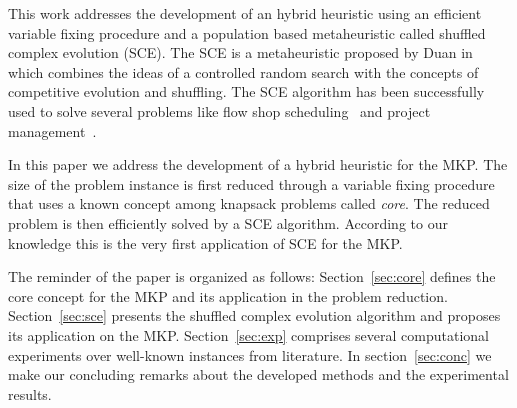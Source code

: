 This work addresses the development of an hybrid heuristic using an
efficient variable fixing procedure and a population based metaheuristic called
shuffled complex evolution (SCE).
The SCE is a metaheuristic proposed by Duan in \cite{duan1992effective}
which combines the ideas of a controlled random search with the concepts
of competitive evolution and shuffling.
The SCE algorithm has been successfully used to solve several problems
like flow shop scheduling~\cite{zhao2014shuffled} and project management~\cite{elbeltagi2007modified}.

In this paper we address the development of a hybrid heuristic for the MKP.
The size of the problem instance is first reduced through a variable fixing
procedure that uses a known concept among knapsack problems called \emph{core}.
The reduced problem is then efficiently solved by a SCE algorithm.
According to our knowledge this is the very first application of SCE
for the MKP.

The reminder of the paper is organized as follows:
Section~\ref{sec:core} defines the core concept for the MKP and its application
in the problem reduction.
Section~\ref{sec:sce} presents the shuffled complex evolution algorithm
and proposes its application on the MKP.
Section~\ref{sec:exp} comprises several computational experiments over well-known
instances from literature.
In section~\ref{sec:conc} we make our concluding remarks about the developed
methods and the experimental results.

